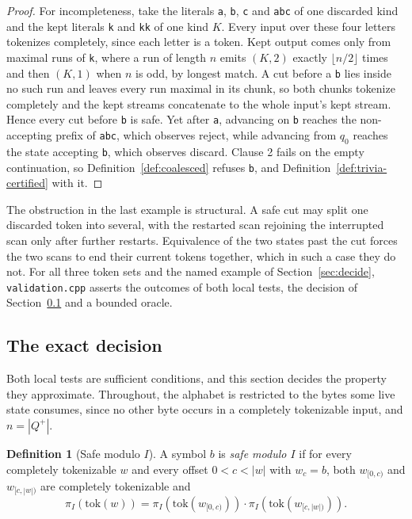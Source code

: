 \documentclass[11pt,a4paper]{article}
\theoremstyle{definition}
\newtheorem{definition}{Definition}
\theoremstyle{plain}
\newcommand{\code}[1]{\texttt{#1}}
\begin{document}
\begin{proof}
For incompleteness, take the literals \code{a}, \code{b}, \code{c} and \code{abc} of one discarded kind and the kept
literals \code{k} and \code{kk} of one kind $K$. Every input over these four letters tokenizes completely, since each
letter is a token. Kept output comes only from maximal runs of \code{k}, where a run of length $n$ emits $(K, 2)$
exactly $\lfloor n/2 \rfloor$ times and then $(K, 1)$ when $n$ is odd, by longest match. A cut before a \code{b} lies
inside no such run and leaves every run maximal in its chunk, so both chunks tokenize completely and the kept streams
concatenate to the whole input's kept stream. Hence every cut before \code{b} is safe. Yet after \code{a}, advancing on
\code{b} reaches the non-accepting prefix of \code{abc}, which observes reject, while advancing from $q_0$ reaches the
state accepting \code{b}, which observes discard. Clause 2 fails on the empty continuation, so
Definition~\ref{def:coalesced} refuses \code{b}, and Definition~\ref{def:trivia-certified} with it.
\end{proof}

The obstruction in the last example is structural. A safe cut may split one discarded token into several, with the
restarted scan rejoining the interrupted scan only after further restarts. Equivalence of the two states past the cut
forces the two scans to end their current tokens together, which in such a case they do not. For all three token sets
and the named example of Section~\ref{sec:decide}, \code{validation.cpp} asserts the outcomes of both local tests, the
decision of Section~\ref{sec:exact} and a bounded oracle.

\subsection{The exact decision}
\label{sec:exact}

Both local tests are sufficient conditions, and this section decides the property they approximate. Throughout, the
alphabet is restricted to the bytes some live state consumes, since no other byte occurs in a completely tokenizable
input, and $n = |Q^+|$.

\begin{definition}[Safe modulo $I$]
\label{def:safe}
A symbol $b$ is \emph{safe modulo $I$} if for every completely tokenizable $w$ and every offset $0 < c < |w|$ with
$w_c = b$, both $w_{[0,c)}$ and $w_{[c,|w|)}$ are completely tokenizable and
\[
\pi_I(\mathrm{tok}(w)) = \pi_I(\mathrm{tok}(w_{[0,c)})) \cdot \pi_I(\mathrm{tok}(w_{[c,|w|)})).
\]
\end{definition}
\end{document}
